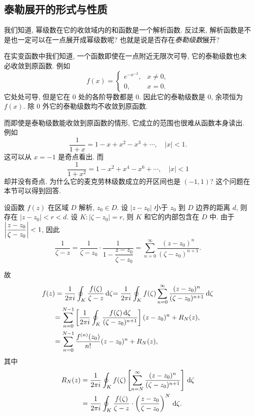 \subsection{泰勒展开的形式与性质}

我们知道, 幂级数在它的收敛域内的和函数是一个解析函数.
反过来, 解析函数是不是也一定可以在一点展开成幂级数呢? 也就是说是否存在\emph{泰勒级数}展开?

在实变函数中我们知道, 一个函数即使在一点附近无限次可导, 它的泰勒级数也未必收敛到原函数.
例如
\[f(x)=\begin{cases}
e^{-x^{-2}},&x\neq 0,\\
0,&x=0.\end{cases}\]
它处处可导, 但是它在 $0$ 处的各阶导数都是 $0$.
因此它的泰勒级数是 $0$, 余项恒为 $f(x)$.
除 $0$ 外它的泰勒级数均不收敛到原函数.

而即使是泰勒级数能收敛到原函数的情形, 它成立的范围也很难从函数本身读出.
例如
\[\dfrac1{1+x}=1-x+x^2-x^3+\cdots,\quad|x|<1.\]
这可以从 $x=-1$ 是奇点看出.
而
\[\dfrac1{1+x^2}=1-x^2+x^4-x^6+\cdots,\quad|x|<1\]
却并没有奇点.
为什么它的麦克劳林级数成立的开区间也是 $(-1,1)$?
这个问题在本节可以得到回答.

设函数 $f(z)$ 在区域 $D$ 解析, $z_0\in D$.
设 $|z-z_0|$ 小于 $z_0$ 到 $D$ 边界的距离 $d$,
则存在 $|z-z_0|<r<d$.
设 $K:|\zeta-z_0|=r$, 则 $K$ 和它的内部包含在 $D$ 中.
由于 $\left|\dfrac{z-z_0}{\zeta-z_0}\right|<1$, 因此
\[\frac1{\zeta-z}=\frac1{\zeta-z_0}\cdot\frac1{1-\dfrac{z-z_0}{\zeta-z_0}}=\sum_{n=0}^\infty\frac{(z-z_0)^n}{(\zeta-z_0)^{n+1}}.\]


\begin{center}
\end{center}

故
\begin{align*}
	f(z)&=\frac1{2\pi i}\oint_K \frac{f(\zeta)}{\zeta-z}\,\mathrm{d}\zeta
	{=\frac1{2\pi i}\oint_K f(\zeta)\sum_{n=0}^\infty\frac{(z-z_0)^n}{(\zeta-z_0)^{n+1}}\,\mathrm{d}\zeta}\\
	&{=
	\sum_{n=0}^{N-1}\left[\frac1{2\pi i}\oint_K\frac{f(\zeta)\,\mathrm{d}\zeta}{(\zeta-z_0)^{n+1}}\right](z-z_0)^n+R_N(z),}\\
	&{=
	\sum_{n=0}^{N-1}\frac{f^{(n)}(z_0)}{n!}(z-z_0)^n+R_N(z),}
\end{align*}
其中
\begin{align*}
	R_N(z)&=\frac1{2\pi i}\oint_Kf(\zeta)\left[\sum_{n=N}^\infty\frac{(z-z_0)^n}{(\zeta-z_0)^{n+1}}\right]\,\mathrm{d}\zeta\\
	&=\frac1{2\pi i}\oint_K\frac{f(\zeta)}{\zeta-z}\cdot\left(\frac{z-z_0}{\zeta-z_0}\right)^N\,\mathrm{d}\zeta.
\end{align*}

